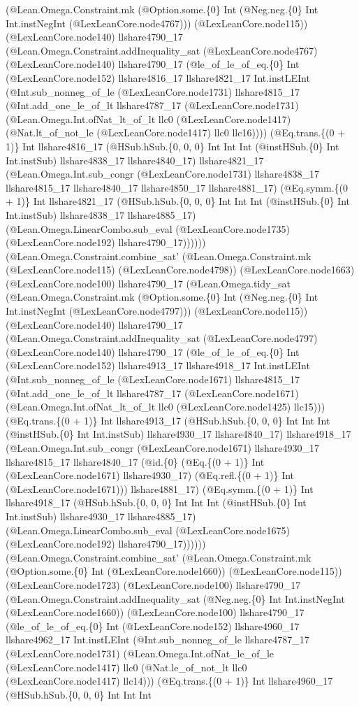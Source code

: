 \documentclass[11pt]{article}
\begin{document}
(@Lean.Omega.Constraint.mk (@Option.some.\{0\} Int (@Neg.neg.\{0\} Int Int.instNegInt (@LexLeanCore.node4767))) (@LexLeanCore.node115)) (@LexLeanCore.node140) llshare4790\_17 (@Lean.Omega.Constraint.addInequality\_sat (@LexLeanCore.node4767) (@LexLeanCore.node140) llshare4790\_17 (@le\_of\_le\_of\_eq.\{0\} Int (@LexLeanCore.node152) llshare4816\_17 llshare4821\_17 Int.instLEInt (@Int.sub\_nonneg\_of\_le (@LexLeanCore.node1731) llshare4815\_17 (@Int.add\_one\_le\_of\_lt llshare4787\_17 (@LexLeanCore.node1731) (@Lean.Omega.Int.ofNat\_lt\_of\_lt llc0 (@LexLeanCore.node1417) (@Nat.lt\_of\_not\_le (@LexLeanCore.node1417) llc0 llc16)))) (@Eq.trans.\{(0 + 1)\} Int llshare4816\_17 (@HSub.hSub.\{0, 0, 0\} Int Int Int (@instHSub.\{0\} Int Int.instSub) llshare4838\_17 llshare4840\_17) llshare4821\_17 (@Lean.Omega.Int.sub\_congr (@LexLeanCore.node1731) llshare4838\_17 llshare4815\_17 llshare4840\_17 llshare4850\_17 llshare4881\_17) (@Eq.symm.\{(0 + 1)\} Int llshare4821\_17 (@HSub.hSub.\{0, 0, 0\} Int Int Int (@instHSub.\{0\} Int Int.instSub) llshare4838\_17 llshare4885\_17) (@Lean.Omega.LinearCombo.sub\_eval (@LexLeanCore.node1735) (@LexLeanCore.node192) llshare4790\_17)))))) (@Lean.Omega.Constraint.combine\_sat' (@Lean.Omega.Constraint.mk (@LexLeanCore.node115) (@LexLeanCore.node4798)) (@LexLeanCore.node1663) (@LexLeanCore.node100) llshare4790\_17 (@Lean.Omega.tidy\_sat (@Lean.Omega.Constraint.mk (@Option.some.\{0\} Int (@Neg.neg.\{0\} Int Int.instNegInt (@LexLeanCore.node4797))) (@LexLeanCore.node115)) (@LexLeanCore.node140) llshare4790\_17 (@Lean.Omega.Constraint.addInequality\_sat (@LexLeanCore.node4797) (@LexLeanCore.node140) llshare4790\_17 (@le\_of\_le\_of\_eq.\{0\} Int (@LexLeanCore.node152) llshare4913\_17 llshare4918\_17 Int.instLEInt (@Int.sub\_nonneg\_of\_le (@LexLeanCore.node1671) llshare4815\_17 (@Int.add\_one\_le\_of\_lt llshare4787\_17 (@LexLeanCore.node1671) (@Lean.Omega.Int.ofNat\_lt\_of\_lt llc0 (@LexLeanCore.node1425) llc15))) (@Eq.trans.\{(0 + 1)\} Int llshare4913\_17 (@HSub.hSub.\{0, 0, 0\} Int Int Int (@instHSub.\{0\} Int Int.instSub) llshare4930\_17 llshare4840\_17) llshare4918\_17 (@Lean.Omega.Int.sub\_congr (@LexLeanCore.node1671) llshare4930\_17 llshare4815\_17 llshare4840\_17 (@id.\{0\} (@Eq.\{(0 + 1)\} Int (@LexLeanCore.node1671) llshare4930\_17) (@Eq.refl.\{(0 + 1)\} Int (@LexLeanCore.node1671))) llshare4881\_17) (@Eq.symm.\{(0 + 1)\} Int llshare4918\_17 (@HSub.hSub.\{0, 0, 0\} Int Int Int (@instHSub.\{0\} Int Int.instSub) llshare4930\_17 llshare4885\_17) (@Lean.Omega.LinearCombo.sub\_eval (@LexLeanCore.node1675) (@LexLeanCore.node192) llshare4790\_17)))))) (@Lean.Omega.Constraint.combine\_sat' (@Lean.Omega.Constraint.mk (@Option.some.\{0\} Int (@LexLeanCore.node1660)) (@LexLeanCore.node115)) (@LexLeanCore.node1723) (@LexLeanCore.node100) llshare4790\_17 (@Lean.Omega.Constraint.addInequality\_sat (@Neg.neg.\{0\} Int Int.instNegInt (@LexLeanCore.node1660)) (@LexLeanCore.node100) llshare4790\_17 (@le\_of\_le\_of\_eq.\{0\} Int (@LexLeanCore.node152) llshare4960\_17 llshare4962\_17 Int.instLEInt (@Int.sub\_nonneg\_of\_le llshare4787\_17 (@LexLeanCore.node1731) (@Lean.Omega.Int.ofNat\_le\_of\_le (@LexLeanCore.node1417) llc0 (@Nat.le\_of\_not\_lt llc0 (@LexLeanCore.node1417) llc14))) (@Eq.trans.\{(0 + 1)\} Int llshare4960\_17 (@HSub.hSub.\{0, 0, 0\} Int Int Int 
\end{document}
